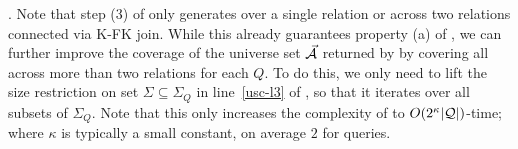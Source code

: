 .
Note that step (3) of \usc only generates \bss over a single
relation or across two relations connected via K-FK join. While
this already guarantees property (a) of \usc, we can further
improve the coverage of the universe set $\vec{{\mathcal A}}$ returned by
\usc by covering all \bss across more than two relations for each
$Q$. To do this, we only need to lift the size restriction on set
$\Sigma\subseteq \Sigma_{Q}$ in line~\ref{usc-l3} of \usc, so
that it iterates over all subsets of $\Sigma_{Q}$. Note that
this only increases
the complexity of \usc to
$O(2^{\kappa}|{\mathcal Q}|)$-time; where $\kappa$ %
is typically a
small constant, \eg on average $2$ %
for  queries.


